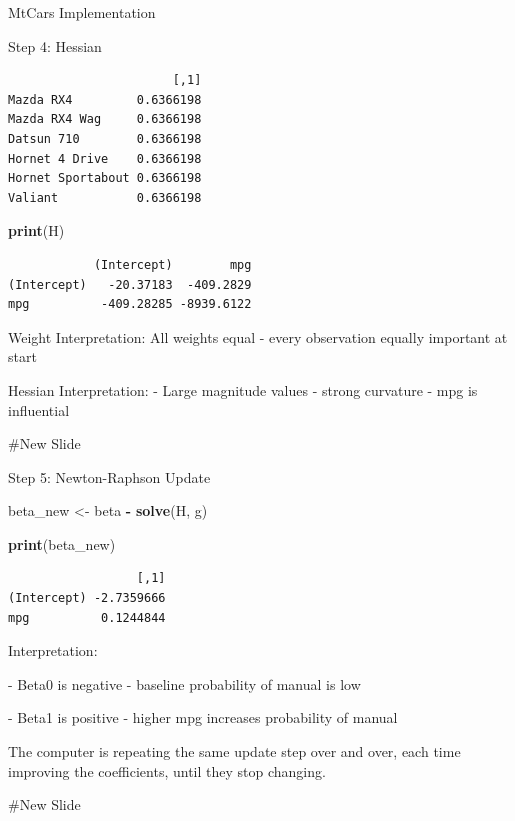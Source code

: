 \documentclass[
  ignorenonframetext,
]{beamer}
\newenvironment{Shaded}{\begin{snugshade}}{\end{snugshade}}
\newcommand{\FunctionTok}[1]{\textcolor[rgb]{0.13,0.29,0.53}{\textbf{#1}}}
\newcommand{\NormalTok}[1]{#1}
\newcommand{\OtherTok}[1]{\textcolor[rgb]{0.56,0.35,0.01}{#1}}
\newcommand{\SpecialCharTok}[1]{\textcolor[rgb]{0.81,0.36,0.00}{\textbf{#1}}}
\begin{document}
\begin{frame}[fragile]{MtCars Implementation}
\begin{block}{Step 4: Hessian}
\begin{verbatim}
                       [,1]
Mazda RX4         0.6366198
Mazda RX4 Wag     0.6366198
Datsun 710        0.6366198
Hornet 4 Drive    0.6366198
Hornet Sportabout 0.6366198
Valiant           0.6366198
\end{verbatim}

\begin{Shaded}
\begin{Highlighting}[]
\FunctionTok{print}\NormalTok{(H)}
\end{Highlighting}
\end{Shaded}

\begin{verbatim}
            (Intercept)        mpg
(Intercept)   -20.37183  -409.2829
mpg          -409.28285 -8939.6122
\end{verbatim}

Weight Interpretation: All weights equal - every observation equally
important at start

Hessian Interpretation: - Large magnitude values - strong curvature -
mpg is influential

\#New Slide
\end{block}

\begin{block}{Step 5: Newton-Raphson Update}
\protect{}\label{step-5-newton-raphson-update-1}
\begin{Shaded}
\begin{Highlighting}[]
\NormalTok{beta\_new }\OtherTok{\textless{}{-}}\NormalTok{ beta }\SpecialCharTok{{-}} \FunctionTok{solve}\NormalTok{(H, g)}

\FunctionTok{print}\NormalTok{(beta\_new)}
\end{Highlighting}
\end{Shaded}

\begin{verbatim}
                  [,1]
(Intercept) -2.7359666
mpg          0.1244844
\end{verbatim}

Interpretation:

- Beta0 is negative - baseline probability of manual is low

- Beta1 is positive - higher mpg increases probability of manual

The computer is repeating the same update step over and over, each time
improving the coefficients, until they stop changing.

\#New Slide
\end{block}


\end{frame}
\end{document}
